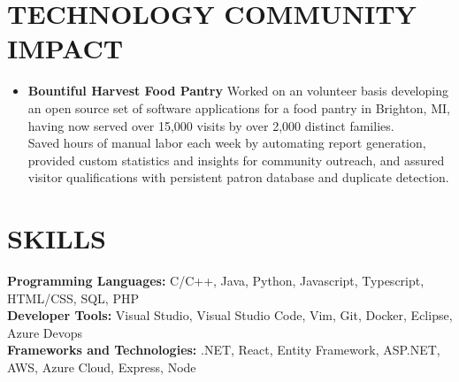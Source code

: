 \documentclass[overlapped]{res}
\begin{document}
\begin{resume}
    \section{TECHNOLOGY COMMUNITY IMPACT}
    
    \begin{itemize}[label={}]  \itemsep -2pt %
        \item \textbf{Bountiful Harvest Food Pantry}
              Worked on an volunteer basis developing an open source set of software applications for a food pantry in Brighton, MI, having now served over 15,000 visits by over 2,000 distinct families. \\
              Saved hours of manual labor each week by automating report generation, provided custom statistics and insights for community outreach, and assured visitor qualifications with persistent patron database and duplicate detection.
    \end{itemize}
    
    \section{SKILLS}
    \vspace{1mm}
        \textbf{Programming Languages:} C/C++, Java, Python, Javascript, Typescript, HTML/CSS, SQL, PHP \\
        \textbf{Developer Tools:} Visual Studio, Visual Studio Code, Vim, Git, Docker, Eclipse, Azure Devops \\
        \textbf{Frameworks and Technologies:} .NET, React, Entity Framework, ASP.NET, AWS, Azure Cloud, Express, Node
    
\end{resume}
\end{document}
